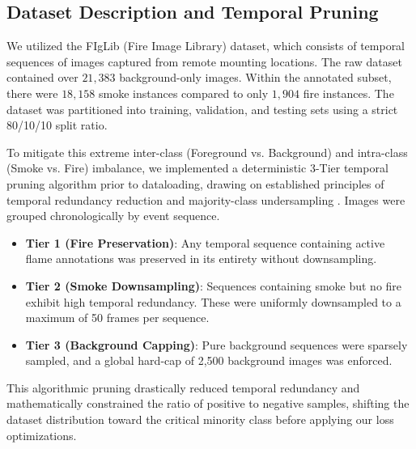 \documentclass[conference]{IEEEtran}
\begin{document}
\subsection{Dataset Description and Temporal Pruning}
We utilized the FIgLib (Fire Image Library) dataset, which consists of temporal sequences of images captured from remote mounting locations. The raw dataset contained over $21,383$ background-only images. Within the annotated subset, there were $18,158$ smoke instances compared to only $1,904$ fire instances. The dataset was partitioned into training, validation, and testing sets using a strict 80/10/10 split ratio. 

To mitigate this extreme inter-class (Foreground vs. Background) and intra-class (Smoke vs. Fire) imbalance, we implemented a deterministic 3-Tier temporal pruning algorithm prior to dataloading, drawing on established principles of temporal redundancy reduction \cite{wu2019adaframe} and majority-class undersampling \cite{drummond2003c4, he2009imbalanced}. Images were grouped chronologically by event sequence. 
\begin{itemize}
    \item \textbf{Tier 1 (Fire Preservation)}: Any temporal sequence containing active flame annotations was preserved in its entirety without downsampling.
    \item \textbf{Tier 2 (Smoke Downsampling)}: Sequences containing smoke but no fire exhibit high temporal redundancy. These were uniformly downsampled to a maximum of 50 frames per sequence.
    \item \textbf{Tier 3 (Background Capping)}: Pure background sequences were sparsely sampled, and a global hard-cap of 2,500 background images was enforced.
\end{itemize}
This algorithmic pruning drastically reduced temporal redundancy and mathematically constrained the ratio of positive to negative samples, shifting the dataset distribution toward the critical minority class before applying our loss optimizations.
\end{document}
